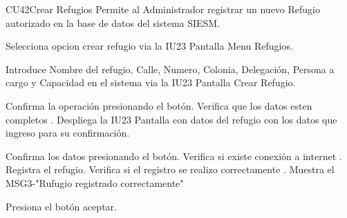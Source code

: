 \begin{UseCase}{CU42}{Crear Refugios}{
		Permite al Administrador registrar un nuevo Refugio autorizado en la base de datos del sistema SIESM.\\
		
}
	
\end{UseCase}



\begin{UCtrayectoria}
	\item\UCactor Selecciona opcion crear refugio via la IU23 Pantalla Menu Refugios.
	\item\UCactor Introduce Nombre del refugio, Calle, Numero, Colonia, Delegación, Persona a cargo y Capacidad en el sistema via la IU23 Pantalla Crear Refugio.
	\item\UCactor Confirma la operación presionando el botón.
	\UCpaso Verifica que los datos esten completos .
	\UCpaso Despliega la IU23 Pantalla con datos del refugio con los datos que ingreso para su confirmación.
	\item\UCactor Confirma los datos presionando el botón.
	\UCpaso Verifica si existe conexión a internet .
	\UCpaso Registra el refugio.
	\UCpaso Verifica si el registro se realizo correctamente .
	\UCpaso Muestra el MSG3-"Rufugio registrado correctamente"
	\item\UCactor Presiona el botón aceptar.
\end{UCtrayectoria}


